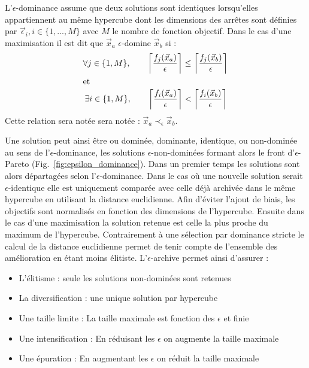 \begin{Def}\label{def:eps_dominance}
L’$\epsilon$-dominance assume que deux solutions sont identiques lorsqu’elles appartiennent
au même hypercube dont les dimensions des arrêtes sont définies par $\vec{\epsilon}_{i}, i \in \{1, ..., M\}$ avec $M$ le nombre
de fonction objectif.
Dans le cas d’une maximisation il est dit que $\vec{x}_{a}$ $\epsilon$-domine $\vec{x}_{b}$ si :
\begin{align*}
  \forall j \in \{1, M\}, \qquad \left\lceil\frac{f_{j}(\vec{x}_{a})}{\epsilon}\right\rceil &\leq \left\lceil\frac{f_{j}(\vec{x}_{b})}{\epsilon}\right\rceil  \\
  \intertext{et}
  \exists i \in \{1, M\}, \qquad \left\lceil\frac{f_{i}(\vec{x}_{a})}{\epsilon}\right\rceil &< \left\lceil\frac{f_{i}(\vec{x}_{b})}{\epsilon}\right\rceil  \\
\end{align*}
Cette relation sera notée sera notée : $\vec{x}_{a} \prec_{\epsilon} \vec{x}_{b}$.
\end{Def}

Une solution peut ainsi être ou dominée, dominante, identique, ou non-dominée au
sens de l’$\epsilon$-dominance, les solutions $\epsilon$-non-dominées formant alors
le front d’$\epsilon$-Pareto (Fig.~\ref{fig:epsilon_dominance}).
Dans un premier temps les solutions sont alors départagées selon l’$\epsilon$-dominance.
Dans le cas où une nouvelle solution serait $\epsilon$-identique elle est uniquement
comparée avec celle déjà archivée dans le même hypercube en utilisant la distance euclidienne.
Afin d’éviter l’ajout de biais, les objectifs sont normalisés en fonction des dimensions
de l’hypercube.
Ensuite dans le cas d’une maximisation la solution retenue est celle la plus proche
du maximum de l’hypercube. Contrairement à une sélection par dominance stricte le
calcul de la distance euclidienne permet de tenir compte de l’ensemble des amélioration
en étant moins élitiste.
L’$\epsilon$-archive permet ainsi d’assurer :
\begin{itemize}
  \item L’élitisme : seule les solutions non-dominées sont retenues
  \item La diversification : une unique solution par hypercube
  \item Une taille limite : La taille maximale est fonction des $\epsilon$ et finie
  \item Une intensification : En réduisant les $\epsilon$ on augmente la taille maximale
  \item Une épuration : En augmentant les $\epsilon$ on réduit la taille maximale
\end{itemize}

